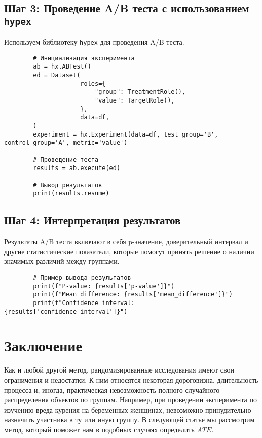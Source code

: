         \subsection{Шаг 3: Проведение A/B теста с использованием \texttt{hypex}}

        Используем библиотеку \texttt{hypex} для проведения A/B теста.

        \begin{verbatim}
        # Инициализация эксперимента
        ab = hx.ABTest()
        ed = Dataset(
                     roles={
                         "group": TreatmentRole(),
                         "value": TargetRole(),
                     }, 
                     data=df,
        )
        experiment = hx.Experiment(data=df, test_group='B', control_group='A', metric='value')

        # Проведение теста
        results = ab.execute(ed)

        # Вывод результатов
        print(results.resume)
        \end{verbatim}

        \subsection{Шаг 4: Интерпретация результатов}

        Результаты A/B теста включают в себя p-значение, доверительный интервал и другие статистические показатели, которые помогут принять решение о наличии значимых различий между группами.

        \begin{verbatim}
        # Пример вывода результатов
        print(f"P-value: {results['p-value']}")
        print(f"Mean difference: {results['mean_difference']}")
        print(f"Confidence interval: {results['confidence_interval']}")
        \end{verbatim}

%


    \section*{Заключение}
        Как и любой другой метод, рандомизированные исследования имеют свои ограничения и недостатки.
        К ним относятся некоторая дороговизна, длительность процесса и, иногда, практическая невозможность полного случайного распределения объектов по группам.
        Например, при проведении эксперимента по изучению вреда курения на беременных женщинах, невозможно принудительно назначить участника в ту или иную группу.
        В следующей статье мы рассмотрим метод, который поможет нам в подобных случаях определить $ATE$.


